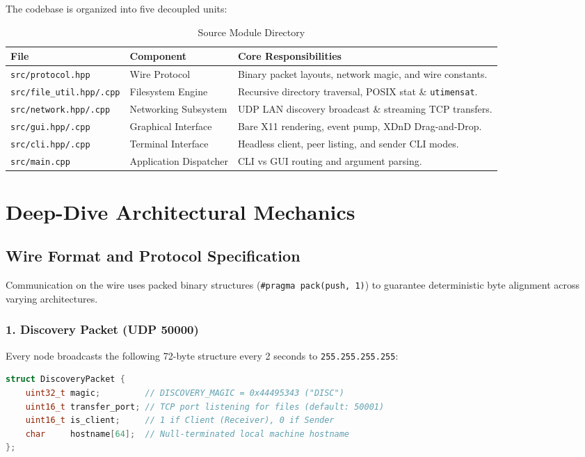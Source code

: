 \documentclass[11pt,a4paper]{article}
\begin{document}
The codebase is organized into five decoupled units:

\begin{table}[h!]
\centering
\small
\begin{tabular}{@{}lll@{}}
\toprule
\textbf{File} & \textbf{Component} & \textbf{Core Responsibilities} \\ \midrule
\texttt{src/protocol.hpp} & Wire Protocol & Binary packet layouts, network magic, and wire constants. \\
\texttt{src/file\_util.hpp/.cpp} & Filesystem Engine & Recursive directory traversal, POSIX stat \& \texttt{utimensat}. \\
\texttt{src/network.hpp/.cpp} & Networking Subsystem & UDP LAN discovery broadcast \& streaming TCP transfers. \\
\texttt{src/gui.hpp/.cpp} & Graphical Interface & Bare X11 rendering, event pump, XDnD Drag-and-Drop. \\
\texttt{src/cli.hpp/.cpp} & Terminal Interface & Headless client, peer listing, and sender CLI modes. \\
\texttt{src/main.cpp} & Application Dispatcher & CLI vs GUI routing and argument parsing. \\
\bottomrule
\end{tabular}
\caption{Source Module Directory}
\end{table}

\section{Deep-Dive Architectural Mechanics}

\subsection{Wire Format and Protocol Specification}
Communication on the wire uses packed binary structures (\texttt{\#pragma pack(push, 1)}) to guarantee deterministic byte alignment across varying architectures.

\subsubsection{1. Discovery Packet (UDP 50000)}
Every node broadcasts the following 72-byte structure every 2 seconds to \texttt{255.255.255.255}:
\begin{lstlisting}[language=C++]
struct DiscoveryPacket {
    uint32_t magic;         // DISCOVERY_MAGIC = 0x44495343 ("DISC")
    uint16_t transfer_port; // TCP port listening for files (default: 50001)
    uint16_t is_client;     // 1 if Client (Receiver), 0 if Sender
    char     hostname[64];  // Null-terminated local machine hostname
};
\end{lstlisting}
\end{document}
